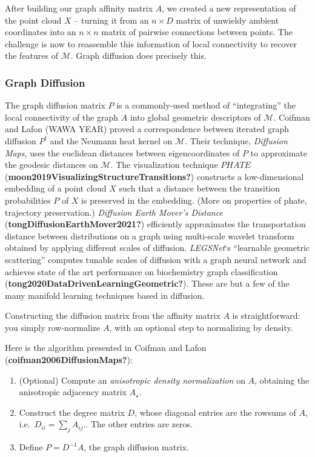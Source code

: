 \documentclass[
]{agujournal2019}
\providecommand{\tightlist}{%
  \setlength{\itemsep}{0pt}\setlength{\parskip}{0pt}}\usepackage{longtable,booktabs,array}
\begin{document}
After building our graph affinity matrix \(A\), we created a new
representation of the point cloud \(X\) -- turning it from an
\(n \times D\) matrix of unwieldy ambient coordinates into an
\(n \times n\) matrix of pairwise connections between points. The
challenge is now to reassemble this information of local connectivity to
recover the features of \(\mathcal{M}\). Graph diffusion does precisely
this.

\subsubsection{Graph Diffusion}\label{graph-diffusion}

The graph diffusion matrix \(P\) is a commonly-used method of
``integrating'' the local connectivity of the graph \(A\) into global
geometric descriptors of \(\mathcal{M}\). Coifman and Lafon (WAWA YEAR)
proved a correspondence between iterated graph diffusion \(P^t\) and the
Neumann heat kernel on \(\mathcal{M}\). Their technique, \emph{Diffusion
Maps}, uses the euclidean distances between eigencoordinates of \(P\) to
approximate the geodesic distances on \(\mathcal{M}\). The visualization
technique \(PHATE\) (\textbf{moon2019VisualizingStructureTransitions?})
constructs a low-dimensional embedding of a point cloud \(X\) such that
a distance between the transition probabilities \(P\) of \(X\) is
preserved in the embedding. (More on properties of phate, trajectory
preservation.) \emph{Diffusion Earth Mover's Distance}
(\textbf{tongDiffusionEarthMover2021?}) efficiently approximates the
transportation distance between distributions on a graph using
multi-scale wavelet transform obtained by applying different scales of
diffusion. \emph{LEGSNet}`s ``learnable geometric scattering'' computes
tunable scales of diffusion with a graph neural network and achieves
state of the art performance on biochemistry graph classification
(\textbf{tong2020DataDrivenLearningGeometric?}). These are but a few of
the many manifold learning techniques based in diffusion.

Constructing the diffusion matrix from the affinity matrix \(A\) is
straightforward: you simply row-normalize \(A\), with an optional step
to normalizing by density.

Here is the algorithm presented in Coifman and Lafon
(\textbf{coifman2006DiffusionMaps?}):

\begin{enumerate}
\def\labelenumi{\arabic{enumi}.}
\tightlist
\item
  (Optional) Compute an \emph{anisotropic density normalization} on
  \(A\), obtaining the anisotropic adjacency matrix \(A_{\star}\).
\item
  Construct the degree matrix \(D\), whose diagonal entries are the
  rowsums of \(A\), i.e.~\(D_{ii} = \sum_{j}A_{ij}\).. The other entries
  are zeros.
\item
  Define \(P = D^{-1} A\), the graph diffusion matrix.
\end{enumerate}
\end{document}
